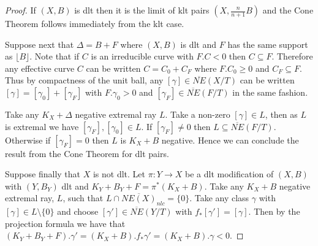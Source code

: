 \begin{proof}
	If $(X,B)$ is dlt then it is the limit of klt pairs $(X,\frac{n}{n+1}B)$ and the Cone Theorem follows immediately from the klt case.
	
%	
	Suppose next that $\Delta=B+F$ where $(X,B)$ is dlt and $F$ has the same support as $\lfloor B \rfloor$. Note that if $C$ is an irreducible curve with $F.C <0$ then $C \subseteq F$. Therefore any effective curve $C$ can be written $C=C_{0} +C_{F}$ where $F.C_{0}\geq 0$ and $C_{F} \subseteq F$. Thus by compactness of the unit ball, any $[\gamma] \in \overline{NE}(X/T)$ can be written $[\gamma] = [\gamma_{0}] + [\gamma_{F}]$ with $F.\gamma_{0} >0$ and $[\gamma_{F}] \in \overline{NE}(F/T)$ in the same fashion.
	
	Take any $K_{X}+\Delta$ negative extremal ray $L$. Take a non-zero $[\gamma] \in L$, then as $L$ is extremal we have $[\gamma_{F}],[\gamma_{0}] \in L$. If $[\gamma_{F}] \neq 0$ then $L \subseteq \overline{NE}(F/T)$. Otherwise if $[\gamma_{F}]=0$ then $L$ is $K_{X}+B$ negative. Hence we can conclude the result from the Cone Theorem for dlt pairs.
	
		
	Suppose finally that $X$ is not dlt. Let $\pi \colon Y \to X$ be a dlt modification of $(X,B)$ with $(Y,B_{Y})$ dlt and $K_{Y}+B_{Y}+F=\pi^{*}(K_{X}+B)$. Take any $K_{X}+B$ negative extremal ray, $L$, such that $L \cap\overline{NE(X)}_{nlc}=\{0\}$. Take any class $\gamma$ with $[\gamma] \in L\setminus \{0\}$ and choose $[\gamma'] \in \overline{NE}(Y/T)$ with $f_{*}[\gamma']=[\gamma]$. Then by the projection formula we have that $(K_{Y}+B_{Y}+F).\gamma'=(K_{X}+B).f_{*}\gamma'=(K_{X}+B).\gamma < 0$. 


\end{proof}
